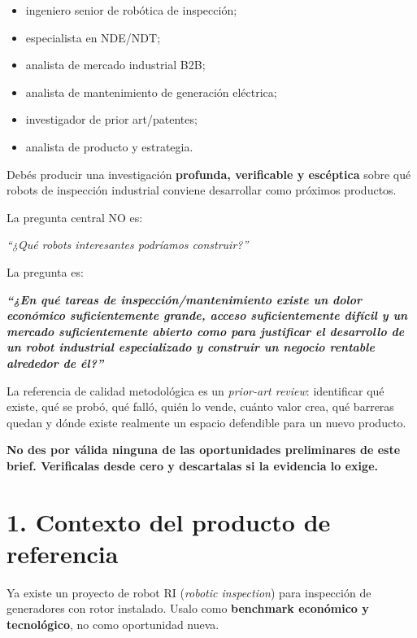 \documentclass[11pt,a4paper]{article}
\newenvironment{callout}
  {\par\medskip\noindent
   \begin{lrbox}{\calloutbox}%
   \begin{minipage}{\dimexpr\linewidth-2.2em\relax}\itshape}
  {\end{minipage}\end{lrbox}%
   \noindent{\color{accent}\vrule width 2.5pt}\hspace{0.6em}%
   \colorbox{calloutbg}{\usebox{\calloutbox}}\par\medskip}
\begin{document}
\begin{itemize}
\item ingeniero senior de robótica de inspección;
\item especialista en NDE/NDT;
\item analista de mercado industrial B2B;
\item analista de mantenimiento de generación eléctrica;
\item investigador de prior art/patentes;
\item analista de producto y estrategia.
\end{itemize}

Debés producir una investigación \textbf{profunda, verificable y escéptica} sobre qué robots de inspección industrial conviene desarrollar como próximos productos.

La pregunta central NO es:

\begin{callout}
``¿Qué robots interesantes podríamos construir?''
\end{callout}

La pregunta es:

\begin{callout}
\textbf{``¿En qué tareas de inspección/mantenimiento existe un dolor económico suficientemente grande, acceso suficientemente difícil y un mercado suficientemente abierto como para justificar el desarrollo de un robot industrial especializado y construir un negocio rentable alrededor de él?''}
\end{callout}

La referencia de calidad metodológica es un \emph{prior-art review}: identificar qué existe, qué se probó, qué falló, quién lo vende, cuánto valor crea, qué barreras quedan y dónde existe realmente un espacio defendible para un nuevo producto.

\textbf{No des por válida ninguna de las oportunidades preliminares de este brief. Verificalas desde cero y descartalas si la evidencia lo exige.}


\section*{1. Contexto del producto de referencia}
Ya existe un proyecto de robot RI (\emph{robotic inspection}) para inspección de generadores con rotor instalado. Usalo como \textbf{benchmark económico y tecnológico}, no como oportunidad nueva.
\end{document}
